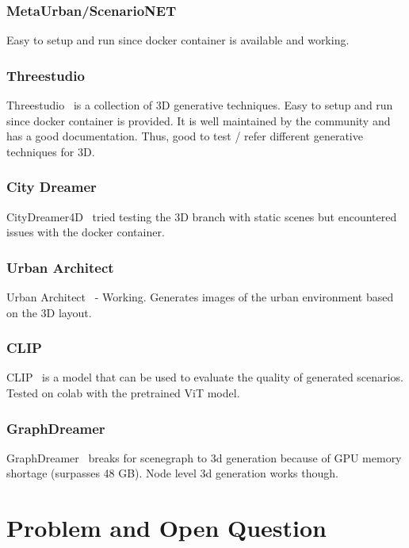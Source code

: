\documentclass{article}
\begin{document}
\subsubsection{MetaUrban/ScenarioNET}

Easy to setup and run since docker container is available and working.

\subsubsection{Threestudio}

Threestudio~\cite{liu2023threestudio} is a collection of 3D generative techniques. Easy to setup and run since docker container is provided. It is well maintained by the community and has a good documentation. Thus, good to test / refer different generative techniques for 3D.

\subsubsection{City Dreamer}

CityDreamer4D~\cite{xie2025citydreamer4d} tried testing the 3D branch with static scenes but encountered issues with the docker container.

\subsubsection{Urban Architect}

Urban Architect~\cite{lu2024urban} - Working. Generates images of the urban environment based on the 3D layout.

\subsubsection{CLIP}

CLIP~\cite{radford2021learning} is a model that can be used to evaluate the quality of generated scenarios. Tested on colab with the pretrained ViT model.

\subsubsection{GraphDreamer}

GraphDreamer~\cite{gao2024graphdreamer} breaks for scenegraph to 3d generation because of GPU memory shortage (surpasses 48 GB). Node level 3d generation works though.

\section{Problem and Open Question}
\end{document}
